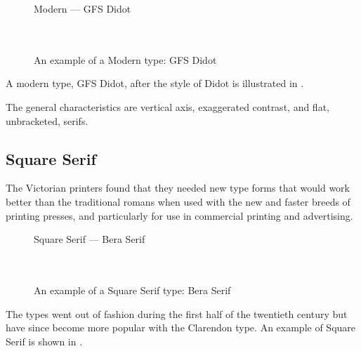 \documentclass[10pt,a4paper,extrafontsizes]{memoir}
\begin{document}
\begin{figure}
\centering
{\centering{}\selectfont
  Modern --- GFS Didot \\
  \UCalphabet \\
  \LCalphabet \\
  \fox\par}
\caption{An example of a Modern type: GFS Didot} 
   \label{fig:didot}
\end{figure}


\begin{paracol}{2}
\switchEng
A modern type, GFS Didot,
after the style of 
Didot is illustrated in .

    The general characteristics are vertical axis, exaggerated contrast, 
and flat, unbracketed, serifs.
\end{paracol}

\subsection{Square Serif}

\begin{paracol}{2}
\switchEng
    The Victorian printers found that they needed new type forms that
would work better than the traditional romans when used with the new 
and faster breeds of printing presses, and particularly for use in
commercial printing and advertising. 
\end{paracol}

\begin{figure}
\centering
{\centering{}\selectfont
  Square Serif --- Bera Serif \\
  \UCalphabet \\
  \LCalphabet \\
  \fox\par}
\caption{An example of a Square Serif type: Bera Serif} 
   \label{fig:beraserif}
\end{figure}

\begin{paracol}{2}
\switchEng
    The types went out of fashion during the first half of the twentieth
century but have since become more popular with the 
Clarendon
type. An example of Square Serif
is shown in .
\end{paracol}
\end{document}
